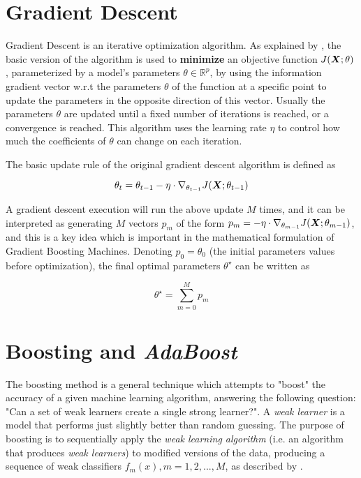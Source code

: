 \section{Gradient Descent}
\label{Gradient Descent}

Gradient Descent is an iterative optimization algorithm. As explained by \cite{Ruder2016AnOO}, the basic version of the algorithm is used to \textbf{minimize} an objective function $J(\bm{X};\theta)$, parameterized by a model's parameters $\theta \in \mathbb{R}^p$, by using the information gradient vector w.r.t the parameters $\theta$ of the function at a specific point to update the parameters in the opposite direction of this vector. Usually the parameters $\theta$ are updated until a fixed number of iterations is reached, or a convergence is reached. This algorithm uses the learning rate $\eta$ to control how much the coefficients of $\theta$ can change on each iteration.

The basic update rule of the original gradient descent algorithm is defined as

\begin{equation}\label{eq:gradientDescent-update}
    \theta_t = \theta_{t-1} - \eta \cdot \nabla_{\theta_{t-1}} J(\bm{X};\theta_{t-1})  
\end{equation}

A gradient descent execution will run the above update $M$ times, and it can be interpreted as generating $M$ vectors $p_m$ of the form $p_m = -\eta\cdot\nabla_{\theta_{m-1}}J(\bm{X};\theta_{m-1})$, and  this is a key idea which is important in the mathematical formulation of Gradient Boosting Machines. 
Denoting $p_0 = \theta_0$ (the initial parameters values before optimization), the final optimal parameters $\theta^\star$ can be written as

\begin{equation}\label{eq:gradientDescent-params}
    \theta^\star = \sum_{m=0}^{M}p_m
\end{equation}

\section{Boosting and \textit{AdaBoost}}

The boosting method is a general technique which attempts to "boost" the accuracy of a given machine learning algorithm, answering the following question: "Can a set of weak learners create a single strong learner?". A \textit{weak learner} is a model that performs just slightly better than random guessing. The purpose of boosting is to sequentially apply the \textit{weak learning algorithm} (i.e. an algorithm that produces \textit{weak learners}) to modified versions of the data, producing a sequence of weak classifiers $f_m(x), m = 1, 2, ..., M$, as described by \cite{hastie2009elements}. 

